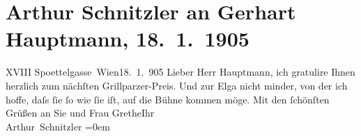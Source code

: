 

         
         \renewcommand{\erwaehntePersonen}{Personen: Gerhart Hauptmann, Margarete Hauptmann}
         \renewcommand{\erwaehnteInstitutionen}{Institutionen: Franz-Grillparzer-Preis}
         \renewcommand{\erwaehnteOrte}{Orte: Edmund-Weiß-Gasse 7, Wien}
         \renewcommand{\erwaehnteWerke}{Werke: Elga}
               \section[Arthur Schnitzler an Gerhart Hauptmann, 18. 1. 1905]{ Arthur Schnitzler an Gerhart Hauptmann, 18. 1. 1905}\nopagebreak{}\rehead{ }\begin{ledgroupsized}[t]{13cm}\normalsize\beginnumbering \toendnotes[C]{\smallbreak\pagebreak[2]} 
\toendnotes[C]{\smallbreak}\pstart
           \raggedleft{}{\pb}XVIII Spoettelgasse \label{T_L01491-1v}\label{T_L01491-1h}Wien18. 1. 905\pend
           \pstart{}Lieber Herr Hauptmann,\pend\pstart
           ich gratulire Ihnen herzlich zum nächſten Grillparzer-Preis. Und zur Elga nicht
               minder, von der ich hoffe, daſs ſie ſo wie ſie iſt, auf die Bühne kommen möge.\pend
           \pstart
           Mit den ſchönſten Grüßen an Sie und Frau GretheIhr{\\[\baselineskip]}\spacefill\mbox{Arthur Schnitzler}\pend
           \leftskip=0em{}
         
         \endnumbering{}\end{ledgroupsized}  \newcommand{\dateiname}{L01491}\newcommand{\titel}{Arthur Schnitzler an Gerhart Hauptmann, 18. 1. 1905}\newcommand{\editorInnen}{ Martin Anton Müller und Gerd-Hermann Susen}
      